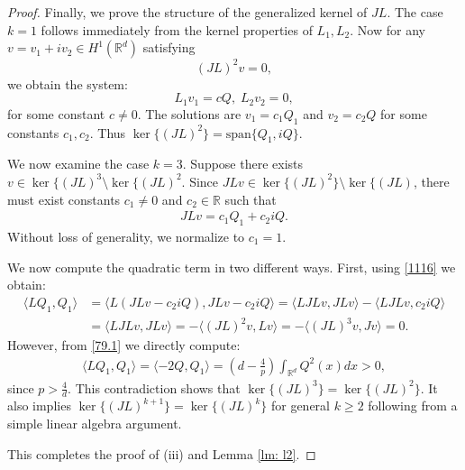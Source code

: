 \documentclass[12pt]{amsart}
\newcommand{\R}{\mathbb R}
\begin{document}
\begin{proof}
Finally, we prove the structure of the generalized kernel of $JL$. The case $k=1$ follows immediately from the kernel properties of $L_1, L_2$. Now for any $v=v_1+iv_2\in H^1(\R^d)$ satisfying
\[(JL)^2 v=0, \]
we obtain the system:
\[L_1v_1=cQ,\; L_2v_2=0, \]
for some constant $c\neq 0$. The solutions are $v_1=c_1Q_1$ and $v_2=c_2Q$ for some constants $c_1, c_2$.  Thus $\ker\{(JL)^2\}=\text{span}\{Q_1, iQ\}$.


We now examine the case $k=3$. Suppose there exists $v\in \ker\{(JL)^3 \setminus \ker\{(JL)^2$. 
Since $JLv\in \ker\{(JL)^2\} \setminus \ker\{(JL)$, there must exist constants $c_1\neq 0$ and $c_2\in \R$ such that 
\begin{align}\label{1116}
JLv=c_1Q_1+c_2 iQ. 
\end{align}
Without loss of generality, we normalize to $c_1=1$. 

We now compute the quadratic term in two different ways. 
First, using \eqref{1116} we obtain: 
\begin{align*}
\langle LQ_1, Q_1\rangle&=\langle L(JLv-c_2iQ), JLv-c_2iQ\rangle =\langle LJLv, JL v\rangle-\langle LJL v, c_2 iQ\rangle\\ 
&=\langle LJL v, JLv\rangle =-\langle (JL)^2 v, Lv\rangle =-\langle (JL)^3v, Jv\rangle=0. 
\end{align*}
However, from \eqref{79.1} we directly compute:
\begin{align}\label{503}
\langle LQ_1, Q_1\rangle =\langle -2Q, Q_1\rangle =(d-\tfrac 4p)\int_{\R^d} Q^2 (x) dx> 0,
\end{align}
since $p>\frac 4d$. This contradiction shows that $\ker\{(JL)^3\}=\ker\{(JL)^2\}$. It also implies  $\ker\{(JL)^{k+1}\}= \ker\{(JL)^k\}$ for general $k \ge 2$ following from a simple linear algebra argument.  

This completes the proof of (iii) and Lemma \ref{lm: l2}. 
\end{proof}
\end{document}
